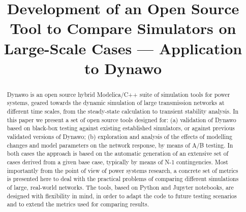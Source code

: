 \documentclass[conference]{IEEEtran}
\begin{document}

\title{Development of an Open Source Tool to Compare Simulators on
  Large-Scale Cases --- Application to Dynawo}

\author{
}

\maketitle

\begin{abstract}
  Dynawo is an open source hybrid Modelica/C++ suite of simulation tools for
  power systems, geared towards the dynamic simulation of large transmission
  networks at different time scales, from the steady-state calculation to
  transient stability analysis. In this paper we present a set of open source
  tools designed for: (a) validation of Dynawo based on black-box testing
  against existing established simulators, or against previous validated
  versions of Dynawo; (b) exploration and analysis of the effects of modelling
  changes and model parameters on the network response, by means of A/B
  testing. In both cases the approach is based on the automatic generation of an
  extensive set of cases derived from a given base case, typically by means of
  N-1 contingencies. Most importantly from the point of view of power systems
  research, a concrete set of metrics is presented here to deal with the
  practical problems of comparing different simulations of large, real-world
  networks. The tools, based on Python and Jupyter notebooks, are designed with
  flexibility in mind, in order to adapt the code to future testing scenarios
  and to extend the metrics used for comparing results.
\end{abstract}
\end{document}
